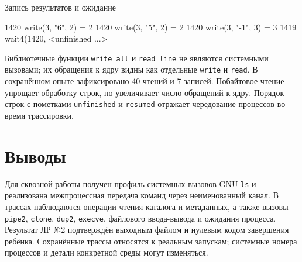 \documentclass[12pt,a4paper]{article}
\begin{document}
\clearpage
\begin{listingblock}{Запись результатов и ожидание}
\begin{terminal}
1420 write(3, "6\n", 2) = 2
1420 write(3, "5\n", 2) = 2
1420 write(3, "-1\n", 3) = 3
1419 wait4(1420, <unfinished ...>
\end{terminal}
\end{listingblock}

Библиотечные функции \texttt{write\_all} и \texttt{read\_line} не являются системными вызовами; их обращения к ядру видны как отдельные \texttt{write} и \texttt{read}. В сохранённом опыте зафиксировано 40 чтений и 7 записей. Побайтовое чтение упрощает обработку строк, но увеличивает число обращений к ядру. Порядок строк с пометками \texttt{unfinished} и \texttt{resumed} отражает чередование процессов во время трассировки.

\section{Выводы}

Для сквозной работы получен профиль системных вызовов GNU \texttt{ls} и реализована межпроцессная передача команд через неименованный канал. В трассах наблюдаются операции чтения каталога и метаданных, а также вызовы \texttt{pipe2}, \texttt{clone}, \texttt{dup2}, \texttt{execve}, файлового ввода-вывода и ожидания процесса. Результат ЛР №2 подтверждён выходным файлом и нулевым кодом завершения ребёнка. Сохранённые трассы относятся к реальным запускам; системные номера процессов и детали конкретной среды могут изменяться.

\end{document}
